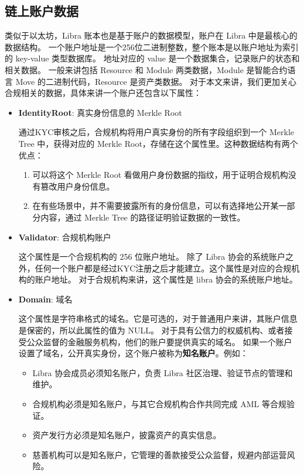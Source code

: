 \subsection{链上账户数据}
类似于以太坊，Libra 账本也是基于账户的数据模型，账户在 Libra 中是最核心的数据结构。
一个账户地址是一个256位二进制整数，整个账本是以账户地址为索引的 key-value 类型数据库。
地址对应的 value 是一个数据集合，记录账户的状态和相关数据。
一般来讲包括 Resource 和 Module 两类数据，Module 是智能合约语言 Move 的二进制代码，Resource 是资产类数据。
对于本文来讲，我们更加关心合规相关的数据，具体来讲一个账户还包含以下属性：

\begin{itemize}
    \item[\dag] \textbf{IdentityRoot}: 真实身份信息的 Merkle Root

    通过KYC审核之后，合规机构将用户真实身份的所有字段组织到一个 Merkle Tree 中，获得对应的 Merkle Root，存储在这个属性里。这种数据结构有两个优点：
    \begin{enumerate}
        \item 可以将这个 Merkle Root 看做用户身份数据的指纹，用于证明合规机构没有篡改用户身份信息。
        \item 在有些场景中，并不需要披露所有的身份信息，可以有选择地公开某一部分内容，通过 Merkle Tree 的路径证明验证数据的一致性。
    \end{enumerate}

    \item[\dag] \textbf{Validator}: 合规机构账户

    这个属性是一个合规机构的 256 位账户地址。
    除了 Libra 协会的系统账户之外，任何一个账户都是经过KYC注册之后才能建立。这个属性是对应的合规机构的账户地址。
    对于合规机构来讲，这个属性是 libra 协会的系统账户地址。

    \item[\dag] \textbf{Domain}: 域名

    这个属性是字符串格式的域名。它是可选的，对于普通用户来讲，其账户信息是保密的，所以此属性的值为 NULL。
    对于具有公信力的权威机构、或者接受公众监督的金融服务机构，他们的账户要提供真实的域名。
    如果一个账户设置了域名，公开真实身份，这个账户被称为\textbf{知名账户}。例如：

    \begin{itemize}
        \item Libra 协会成员必须知名账户，负责 Libra 社区治理、验证节点的管理和维护。
        \item 合规机构必须是知名账户，与其它合规机构合作共同完成 AML 等合规验证。
        \item 资产发行方必须是知名账户，披露资产的真实信息。
        \item 慈善机构可以是知名账户，它管理的善款接受公众监督，规避内部运营风险。
    \end{itemize}
\end{itemize}

